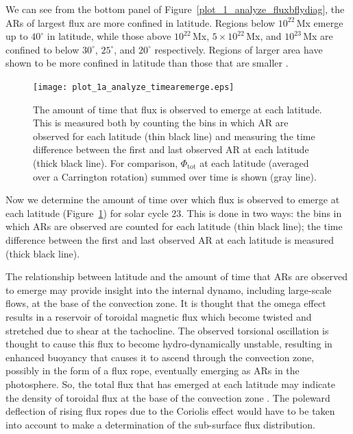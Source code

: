 We can see from the bottom panel of Figure~\ref{plot_1_analyze_fluxbflydiag}, the \glspl{AR} of largest flux are more confined in latitude. Regions below $10^{22}$\,Mx emerge up to $40^\circ$ in latitude, while those above  $10^{22}$\,Mx,  $5\times10^{22}$\,Mx, and  $10^{23}$\,Mx are confined to below $30^\circ$, $25^\circ$, and $20^\circ$ respectively. Regions of larger area have shown to be more confined in latitude than those that are smaller \citep{tang:1984,harvey:1993,meunier:2003}.


\begin{figure}[!t]
\centerline{\texttt{[image: plot\_1a\_analyze\_timearemerge.eps]}}
\caption[A plot of the amount of time flux emerges at each latitude.]{The amount of time that flux is observed to emerge at each latitude. This is measured both by counting the bins in which AR are observed for each latitude (thin black line) and measuring the time difference between the first and last observed AR at each latitude (thick black line). For comparison, $\Phi_{\mathrm{tot}}$ at each latitude (averaged over a Carrington rotation) summed over time is shown (gray line).}\label{plot_1a_analyze_timearemerge}
\end{figure}


Now we determine the amount of time over which flux is observed to emerge at each latitude (Figure~\ref{plot_1a_analyze_timearemerge}) for solar cycle 23. This is done in two ways: the bins in which \glspl{AR} are observed are counted for each latitude (thin black line); the time difference between the first and last observed \gls{AR} at each latitude is measured (thick black line). %

The relationship between latitude and the amount of time that \glspl{AR} are observed to emerge may provide insight into the internal dynamo, including large-scale flows, at the base of the convection zone. It is thought that the omega effect results in a reservoir of toroidal magnetic flux which become twisted and stretched due to shear at the tachocline. The observed torsional oscillation is thought to cause this flux to become hydro-dynamically unstable, resulting in enhanced buoyancy that causes it to ascend through the convection zone, possibly in the form of a flux rope, eventually emerging as \glspl{AR} in the photosphere. So, the total flux that has emerged at each latitude may indicate the density of toroidal flux at the base of the convection zone \citep{Charbonneau:2010}.
The poleward deflection of rising flux ropes due to the Coriolis effect would have to be taken into account to make a determination of the sub-surface flux distribution.

